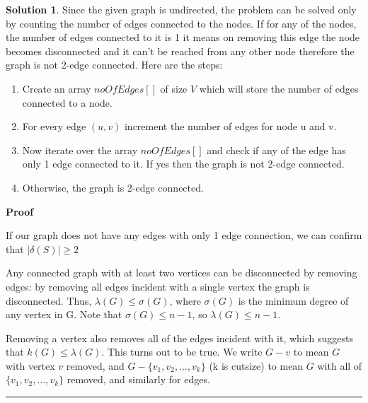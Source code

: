 \documentclass{article}
\theoremstyle{definition}
\def\fline{\rule{0.75\linewidth}{0.5pt}}
\newcommand{\finishline}{\begin{center}\fline\end{center}}
\newtheorem*{solution*}{Solution}
\newenvironment{solution}{\begin{solution*}}{{\finishline} \end{solution*}}
\begin{document}
\begin{solution}
\item Since the given graph is undirected, the problem can be solved only by counting the number of edges connected to the nodes. If for any of the nodes, the number of edges connected to it is 1 it means on removing this edge the node becomes disconnected and it can’t be reached from any other node therefore the graph is not 2-edge connected. Here are the steps: 
\begin{enumerate}
\item Create an array $noOfEdges[]$ of size $V$ which will store the number of edges connected to a node.
\item For every edge $(u, v)$ increment the number of edges for node u and v.
\item Now iterate over the array $noOfEdges[]$ and check if any of the edge has only 1 edge connected to it. If yes then the graph is not 2-edge connected.
\item Otherwise, the graph is 2-edge connected.
\end{enumerate}
\item\textbf{Proof}
\item If our graph does not have any edges with only 1 edge connection, we can confirm that $|\delta(S)| \geq 2$ 
\item Any connected graph with at least two vertices can be disconnected by removing edges: by removing all edges incident with a single vertex the graph is disconnected. Thus, $\lambda(G) \leq \sigma(G)$, where $\sigma(G)$ is the minimum degree of any vertex in G. Note that $\sigma(G) \leq n-1$, so $\lambda(G) \leq n-1$.
\item Removing a vertex also removes all of the edges incident with it, which suggests that $k(G) \leq \lambda(G)$. This turns out to be true. We write $G-v$ to mean $G$ with vertex $v$ removed, and $G-\{v_1,v_2,…,v_k\}$ (k is cutsize) to mean $G$ with all of $\{v_1,v_2,…,v_k\}$ removed, and similarly for edges.
\end{solution}


\medskip
\end{document}
